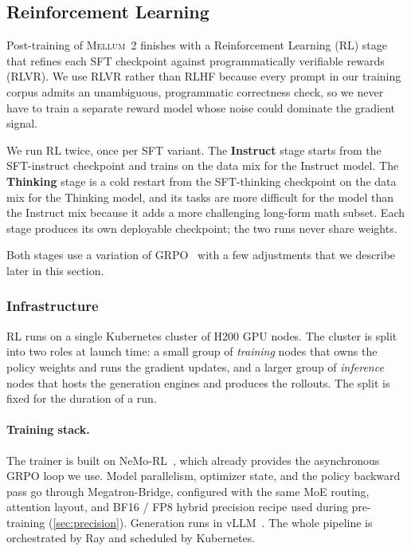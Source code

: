 \documentclass{llmxive}
\providecommand{\modelname}{\textsc{Mellum~2}\xspace}
\begin{document}
\subsection{Reinforcement Learning}
\label{sec:rl}

Post-training of \modelname finishes with a Reinforcement Learning (RL) stage
that refines each SFT checkpoint against programmatically verifiable
rewards (RLVR). We use RLVR rather than RLHF because every prompt in our
training corpus admits an unambiguous, programmatic correctness check, so
we never have to train a separate reward model whose noise could
dominate the gradient signal.

We run RL twice, once per SFT variant. The \textbf{Instruct} stage starts
from the SFT-instruct checkpoint and trains on the data mix for the
Instruct model. The \textbf{Thinking} stage is a cold restart from the
SFT-thinking checkpoint on the data mix for the Thinking model, and its tasks are more difficult for the model than the Instruct mix because it adds a more challenging long-form math subset. Each stage produces its own deployable checkpoint; the two
runs never share weights.

Both stages use a variation of GRPO~\cite{shao2024deepseekmath} with a
few adjustments that we describe later in this section.

\subsubsection{Infrastructure}
\label{sec:rl-infra}

RL runs on a single Kubernetes cluster of H200 GPU nodes. The cluster is
split into two roles at launch time: a small
group of \emph{training} nodes that owns the policy weights and runs the
gradient updates, and a larger group of \emph{inference} nodes that hosts
the generation engines and produces the rollouts. The split is fixed for
the duration of a run.

\paragraph{Training stack.}
The trainer is built on NeMo-RL~\cite{nemo-rl}, which already provides
the asynchronous GRPO loop we use. Model parallelism, optimizer state, and the policy
backward pass go through Megatron-Bridge, configured with the same MoE
routing, attention layout, and BF16 / FP8 hybrid precision recipe used
during pre-training (\cref{sec:precision}). Generation runs in
vLLM~\cite{kwon2023vllm}. The whole pipeline is orchestrated by Ray and
scheduled by Kubernetes.
\end{document}
